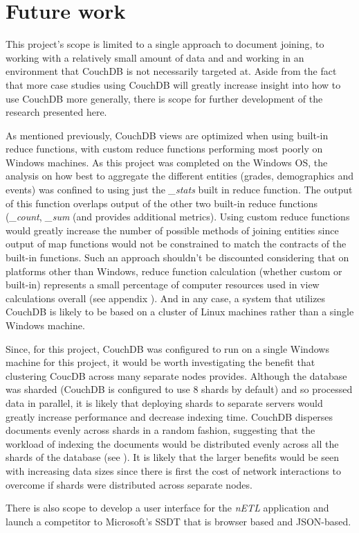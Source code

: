 \section{Future work}
This project's scope is limited to a single approach to document joining, to working with a relatively small amount of data and and working in an environment that CouchDB is not necessarily targeted at. Aside from the fact that more case studies using CouchDB will greatly increase insight into how to use CouchDB more generally, there is scope for further development of the research presented here.

As mentioned previously, CouchDB views are optimized when using built-in reduce functions, with custom reduce functions performing most poorly on Windows machines. As this project was completed on the Windows OS, the analysis on how best to aggregate the different entities (grades, demographics and events) was confined to using just the \textit{\_stats} built in reduce function. The output of this function overlaps output of the other two built-in reduce functions (\textit{\_count}, \textit{\_sum} (and provides additional metrics). Using custom reduce functions would greatly increase the number of possible methods of joining entities since output of map functions would not be constrained to match the contracts of the built-in functions. Such an approach shouldn't be discounted considering that on platforms other than Windows, reduce function calculation (whether custom or built-in) represents a small percentage of computer resources used in view calculations overall (see appendix \cite{slack1Nov}). And in any case, a system that utilizes CouchDB is likely to be based on a cluster of Linux machines rather than a single Windows machine.

Since, for this project, CouchDB was configured to run on a single Windows machine for this project, it would be worth investigating the benefit that clustering CoucDB across many separate nodes provides. Although the database was sharded (CouchDB is configured to use 8 shards by default) and so processed data in parallel, it is likely that deploying shards to separate servers would greatly increase performance and decrease indexing time. CouchDB disperses documents evenly across shards in a random fashion, suggesting that the workload of indexing the documents would be distributed evenly across all the shards of the database (see \cite{slack7Nov}). It is likely that the larger benefits would be seen with increasing data sizes since there is first the cost of network interactions to overcome if shards were distributed across separate nodes.

There is also scope to develop a user interface for the \textit{nETL} application and launch a competitor to Microsoft's SSDT that is browser based and JSON-based.